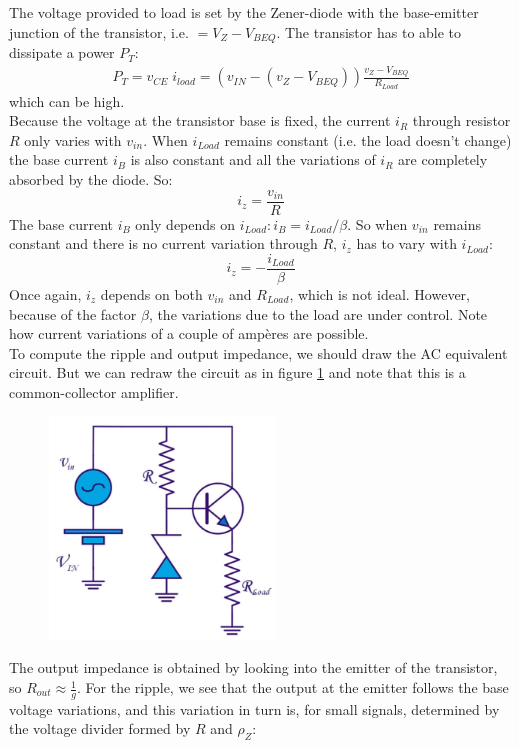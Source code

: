 The voltage provided to load is set by the Zener-diode with the base-emitter junction of the transistor, i.e. $= V_Z - V_{BEQ}$. The transistor has to able to dissipate a power $P_T$:
\begin{align*}
	P_T = v_{CE} \; i_{load} = (v_{IN} - (v_Z - V_{BEQ})) \frac{v_Z - V_{BEQ}}{R_{Load}}
\end{align*}
which can be high.\\
Because the voltage at the transistor base is fixed, the current $i_R$ through resistor $R$ only varies with $v_{in}$. When $i_{Load}$ remains constant (i.e. the load doesn't change) the base current $i_B$ is also constant and all the variations of $i_R$ are completely absorbed by the diode. So: 
$$ i_z = \frac{v_{in}}{R}$$
The base current $i_B$ only depends on $i_{Load}: i_B =  i_{Load}/\beta$. So when $v_{in}$ remains constant and there is no current variation through $R$, $i_z$ has to vary with $i_{Load}$:
$$
i_z = -\frac{i_{Load}}{\beta}
$$
Once again, $i_z$ depends on both $v_{in}$ and $R_{Load}$, which is not ideal. However, because of the factor $\beta$, the variations due to the load are under control. Note how current variations of a couple of ampères are possible.\\
To compute the ripple and output impedance, we should draw the AC equivalent circuit. But we can redraw the circuit as in figure \ref{fig:stabilizer7} and note that this is a common-collector amplifier.\\
\begin{figure}[h!]
	\centering
	\includegraphics[width=6cm]{figures/ch12/stabilizer7.jpg}
	\caption{}
	\label{fig:stabilizer7}
\end{figure}
The output impedance is obtained by looking into the emitter of the transistor, so $R_{out} \approx \frac{1}{g}$. For the ripple, we see that the output at the emitter follows the base voltage variations, and this variation in turn is, for small signals, determined by the voltage divider formed by $R$ and $\rho_Z$:
